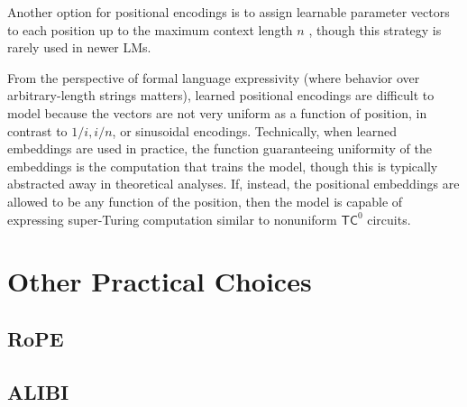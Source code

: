Another option for positional encodings is to assign learnable parameter vectors to each position up to the maximum context length $n$ \citep{vaswani-etal-2017-attention}, though this strategy is rarely used in newer LMs.

From the perspective of formal language expressivity (where behavior over arbitrary-length strings matters), learned positional encodings are difficult to model because the vectors are not very uniform as a function of position, in contrast to $1/i, i/n$, or sinusoidal encodings.
Technically, when learned embeddings are used in practice, the function guaranteeing uniformity of the embeddings is the computation that trains the model, though this is typically abstracted away in theoretical analyses.
If, instead, the positional embeddings are allowed to be any function of the position, then the model is capable of expressing super-Turing computation similar to nonuniform $\mathsf{TC}^0$ circuits.

\section{Other Practical Choices}

\subsection{RoPE}

\subsection{ALIBI}